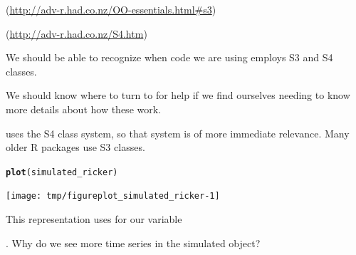 \documentclass{beamer}\usepackage[]{graphicx}\usepackage[]{color}
\makeatletter
\newcommand{\hlstd}[1]{\textcolor[rgb]{0.345,0.345,0.345}{#1}}%
\newcommand{\hlkwd}[1]{\textcolor[rgb]{0.737,0.353,0.396}{\textbf{#1}}}%
\newenvironment{kframe}{%
 \def\at@end@of@kframe{}%
 \ifinner\ifhmode%
  \def\at@end@of@kframe{\end{minipage}}%
  \begin{minipage}{\columnwidth}%
 \fi\fi%
 \def\FrameCommand##1{\hskip\@totalleftmargin \hskip-\fboxsep
 \colorbox{shadecolor}{##1}\hskip-\fboxsep
     \hskip-\linewidth \hskip-\@totalleftmargin \hskip\columnwidth}%
 \MakeFramed {\advance\hsize-\width
   \@totalleftmargin\z@ \linewidth\hsize
   \@setminipage}}%
 {\par\unskip\endMakeFramed%
 \at@end@of@kframe}
\newenvironment{knitrout}{}{} %
\newcommand\answer[2]{#1} %
\makeatother
\begin{document}
\begin{frame}[fragile]

\bi

\item {} (\url{http://adv-r.had.co.nz/OO-essentials.html#s3})

\item {} (\url{http://adv-r.had.co.nz/S4.htm})

\item We should be able to recognize when code we are using employs S3 and S4 classes.

\item We should know where to turn to for help if we find ourselves needing to know more details about how these work.

\item {} uses the S4 class system, so that system is of more immediate relevance. Many older R packages use S3 classes.

\ei

\end{frame}    

\begin{frame}[fragile] 

\begin{knitrout}\small
{}\color{fgcolor}\begin{kframe}
\begin{alltt}
\hlkwd{plot}\hlstd{(simulated_ricker)}
\end{alltt}
\end{kframe}
\end{knitrout}

\vspace{-10mm}

\begin{knitrout}\small
{}\color{fgcolor}

{\centering \texttt{[image: tmp/figureplot\_simulated\_ricker-1]} 

}



\end{knitrout}

\vspace{-3mm}

\bi
\item This  representation uses  for our variable  
\ei

\myquestion. Why do we see more time series in the simulated  object?

\answer{\vspace{30mm}}{todo}

\end{frame}
\end{document}
